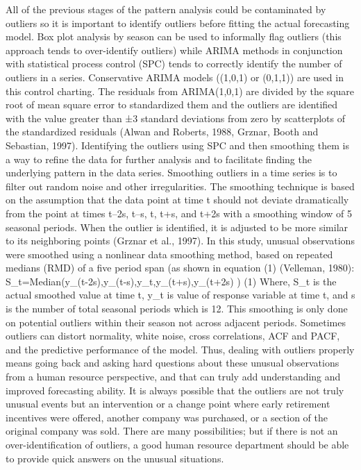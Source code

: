 All of the previous stages of the pattern analysis could be contaminated by outliers so it is important to identify outliers before fitting the actual forecasting model. Box plot analysis by season can be used to informally flag outliers (this approach tends to over-identify outliers) while ARIMA methods in conjunction with statistical process control (SPC) tends to correctly identify the number of outliers in a series. Conservative ARIMA models ((1,0,1) or (0,1,1))  are used in this control charting. The residuals from ARIMA(1,0,1) are divided by the square root of mean square error to standardized them and the outliers are identified with the value greater than ±3 standard deviations from zero by scatterplots of the standardized residuals (Alwan and Roberts, 1988, Grznar, Booth and Sebastian, 1997). Identifying the outliers using SPC and then smoothing them is a way to refine the data for further analysis and to facilitate finding the underlying pattern in the data series. Smoothing outliers in a time series is to filter out random noise and other irregularities. The smoothing technique is based on the assumption that the data point at time t should not deviate dramatically from the point at times t–2s, t–s, t, t+s, and t+2s with a smoothing window of 5 seasonal periods. When the outlier is identified, it is adjusted to be more similar to its neighboring points (Grznar et al., 1997). In this study, unusual observations were smoothed using a nonlinear data smoothing method, based on repeated medians (RMD) of a five period span (as shown in equation (1) (Velleman, 1980):
S_t=Median(y_(t-2s),y_(t-s),y_t,y_(t+s),y_(t+2s) )            (1)
Where, S_t  is the actual smoothed value at time t, y_t is value of response variable at time t, and s is the number of total seasonal periods which is 12. This smoothing is only done on potential outliers within their season not across adjacent periods. Sometimes outliers can distort normality, white noise, cross correlations, ACF and PACF, and the predictive performance of the model.  Thus, dealing with outliers properly means going back and asking hard questions about these unusual observations from a human resource perspective, and that can truly add understanding and improved forecasting ability.  It is always possible that the outliers are not truly unusual events but an intervention or a change point where early retirement incentives were offered, another company was purchased, or a section of the original company was sold.  There are many possibilities; but if there is not an over-identification of outliers, a good human resource department should be able to provide quick answers on the unusual situations.
